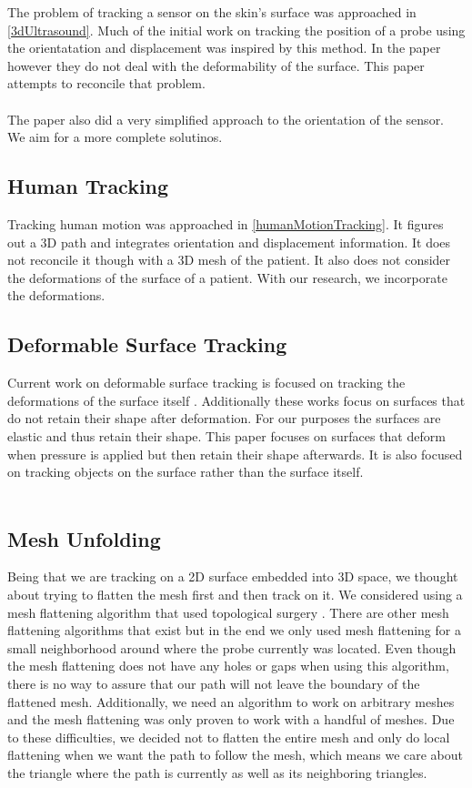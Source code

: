 The problem of tracking a sensor on the skin's surface was approached in \ref{3dUltrasound}. Much of the initial work on tracking the position of a probe using the orientatation and displacement was inspired by this method. In the paper however they do not deal with the deformability of the surface. This paper attempts to reconcile that problem.\\
\\
The paper also did a very simplified approach to the orientation of the sensor. We aim for a more complete solutinos. 
\subsection{Human Tracking}

Tracking human motion was approached in \ref{humanMotionTracking}. It figures out a 3D path and integrates orientation and displacement information. It does not reconcile it though with a 3D mesh of the patient. It also does not consider the deformations of the surface of a patient. With our research, we incorporate the deformations. 

\subsection{Deformable Surface Tracking}

Current work on deformable surface tracking is focused on tracking the deformations of the surface itself \cite{deformableobjecttracking,convexopt}. Additionally these works focus on surfaces that do not retain their shape after deformation. For our purposes the surfaces are elastic and thus retain their shape. This paper focuses on surfaces that deform when pressure is applied but then retain their shape afterwards. It is also focused on tracking objects on the surface rather than the surface itself.\\
\\

\subsection{Mesh Unfolding}

Being that we are tracking on a 2D surface embedded into 3D space, we thought about trying to flatten the mesh first and then track on it. We considered using a mesh flattening algorithm that used topological surgery \cite{meshunfolding}. There are other mesh flattening algorithms that exist but in the end we only used mesh flattening for a small neighborhood around where the probe currently was located. Even though the mesh flattening does not have any holes or gaps when using this algorithm, there is no way to assure that our path will not leave the boundary of the flattened mesh. Additionally, we need an algorithm to work on arbitrary meshes and the mesh flattening was only proven to work with a handful of meshes. Due to these difficulties, we decided not to flatten the entire mesh and only do local flattening when we want the path to follow the mesh, which means we care about the triangle where the path is currently as well as its neighboring triangles. 